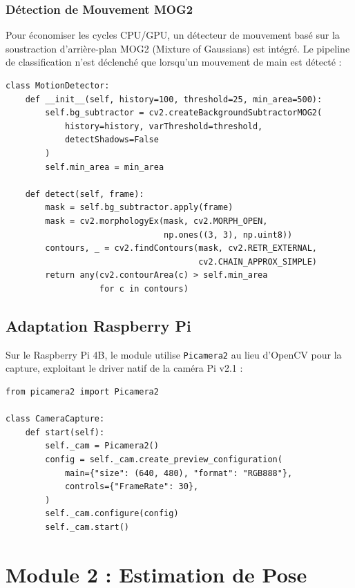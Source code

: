 \subsubsection{Détection de Mouvement MOG2}

Pour économiser les cycles CPU/GPU, un détecteur de mouvement basé sur la soustraction d'arrière-plan MOG2 (Mixture of Gaussians) est intégré. Le pipeline de classification n'est déclenché que lorsqu'un mouvement de main est détecté :

\begin{lstlisting}[style=python, caption={Détecteur de mouvement MOG2}]
class MotionDetector:
    def __init__(self, history=100, threshold=25, min_area=500):
        self.bg_subtractor = cv2.createBackgroundSubtractorMOG2(
            history=history, varThreshold=threshold,
            detectShadows=False
        )
        self.min_area = min_area

    def detect(self, frame):
        mask = self.bg_subtractor.apply(frame)
        mask = cv2.morphologyEx(mask, cv2.MORPH_OPEN,
                                np.ones((3, 3), np.uint8))
        contours, _ = cv2.findContours(mask, cv2.RETR_EXTERNAL,
                                       cv2.CHAIN_APPROX_SIMPLE)
        return any(cv2.contourArea(c) > self.min_area
                   for c in contours)
\end{lstlisting}

\subsection{Adaptation Raspberry Pi}

Sur le Raspberry Pi 4B, le module utilise \texttt{Picamera2} au lieu d'OpenCV pour la capture, exploitant le driver natif de la caméra Pi v2.1 :

\begin{lstlisting}[style=python, caption={Capture avec Picamera2}]
from picamera2 import Picamera2

class CameraCapture:
    def start(self):
        self._cam = Picamera2()
        config = self._cam.create_preview_configuration(
            main={"size": (640, 480), "format": "RGB888"},
            controls={"FrameRate": 30},
        )
        self._cam.configure(config)
        self._cam.start()
\end{lstlisting}

\section{Module 2 : Estimation de Pose}

